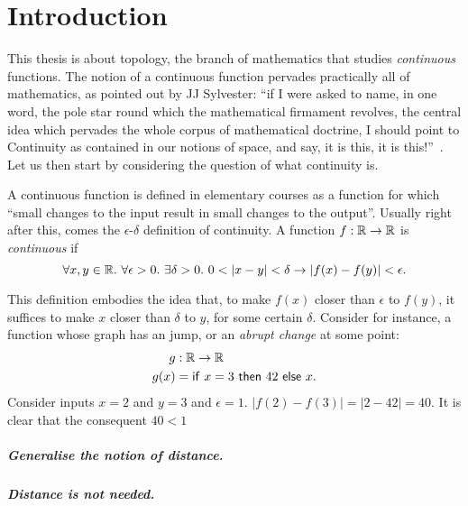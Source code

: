 \chapter{Introduction}

This thesis is about topology, the branch of mathematics that studies \emph{continuous}
functions. The notion of a continuous function pervades practically all of mathematics, as
pointed out by JJ Sylvester: ``if I were asked to name, in one word, the pole star round
which the mathematical firmament revolves, the central idea which pervades the whole
corpus of mathematical doctrine, I should point to Continuity as contained in our notions
of space, and say, it is this, it is this!''~\cite[pg. 27]{armstrong_basic_2011}. Let us
then start by considering the question of what continuity is.

A continuous function is defined in elementary courses as a function for which ``small
changes to the input result in small changes to the output''. Usually right after this,
comes the $\epsilon$-$\delta$ definition of continuity. A function $f : \mathbb{R}{} \rightarrow \mathbb{R}{}$ is
\emph{continuous} if
\begin{equation*}
  \forall x, y \in \mathbb{R}{}.\ \forall \epsilon > 0.\ \exists \delta > 0.\ 0 < | x - y | < \delta \rightarrow | f(x) - f(y) | < \epsilon.
\end{equation*}

This definition embodies the idea that, to make $f(x)$ closer than $\epsilon$ to $f(y)$, it
suffices to make $x$ closer than $\delta$ to $y$, for some certain $\delta$. Consider for instance,
a function whose graph has an jump, or an \emph{abrupt change} at some point:
\begin{align*}
  g    &: \mathbb{R}{} \rightarrow \mathbb{R}{}\\
  g(x) &= \mathsf{if}\ x = 3\ \mathsf{then}\ 42\ \mathsf{else}\ x.
\end{align*}
Consider inputs $x = 2$ and $y = 3$ and $\epsilon = 1$. $| f(2) - f(3) | = | 2 - 42 | = 40$. It
is clear that the consequent $40 < 1$

\paragraph{Generalise the notion of distance.}

\paragraph{Distance is not needed.}
